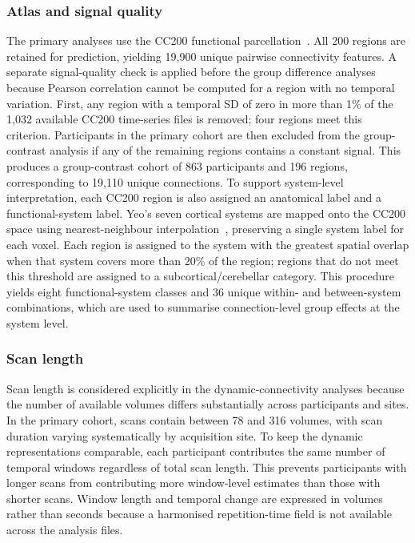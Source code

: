 \subsubsection{Atlas and signal quality}
\label{subsubsec:atlas-signal-quality}

The primary analyses use the CC200 functional parcellation~\citep{Craddocketal2012}. All 200 regions are retained for prediction, yielding 19,900 unique pairwise connectivity features. A separate signal-quality check is applied before the group difference analyses because Pearson correlation cannot be computed for a region with no temporal variation. First, any region with a temporal SD of zero in more than 1\% of the 1,032 available CC200 time-series files is removed; four regions meet this criterion. Participants in the primary cohort are then excluded from the group-contrast analysis if any of the remaining regions contains a constant signal. This produces a group-contrast cohort of 863 participants and 196 regions, corresponding to 19,110 unique connections. To support system-level interpretation, each CC200 region is also assigned an anatomical label and a functional-system label. Yeo's seven cortical systems are mapped onto the CC200 space using nearest-neighbour interpolation~\citep{Yeoetal2011}, preserving a single system label for each voxel. Each region is assigned to the system with the greatest spatial overlap when that system covers more than 20\% of the region; regions that do not meet this threshold are assigned to a subcortical/cerebellar category. This procedure yields eight functional-system classes and 36 unique within- and between-system combinations, which are used to summarise connection-level group effects at the system level.

\subsubsection{Scan length}
\label{subsubsec:scan-length}

Scan length is considered explicitly in the dynamic-connectivity analyses because the number of available volumes differs substantially across participants and sites. In the primary cohort, scans contain between 78 and 316 volumes, with scan duration varying systematically by acquisition site. To keep the dynamic representations comparable, each participant contributes the same number of temporal windows regardless of total scan length. This prevents participants with longer scans from contributing more window-level estimates than those with shorter scans. Window length and temporal change are expressed in volumes rather than seconds because a harmonised repetition-time field is not available across the analysis files.

